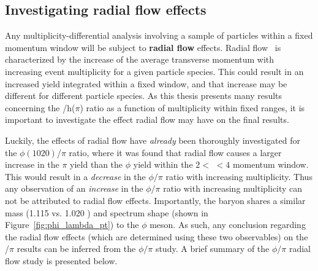 \clearpage

\subsection{Investigating radial flow effects}

Any multiplicity-differential analysis involving a sample of particles within a fixed \pt momentum window will be subject to \textbf{radial flow} effects. Radial flow~\cite{RadialFlow} is characterized by the increase of the average transverse momentum \meanpt with increasing event multiplicity for a given particle species. This could result in an increased yield integrated within a fixed \pt window, and that increase may be different for different particle species. As this thesis presents many results concerning the \lmb/h($\pi$) ratio as a function of multiplicity within fixed \pt ranges, it is important to investigate the effect radial flow may have on the final results.

Luckily, the effects of radial flow have \textit{already} been thoroughly investigated for the $\phi(1020)$/$\pi$ ratio, where it was found that radial flow causes a larger increase in the $\pi$ yield than the $\phi$ yield within the $2 <$ \pt $< 4$ \GeVc momentum window. This would result in a \textit{decrease} in the $\phi / \pi$ ratio with increasing multiplicity. Thus any observation of an \textit{increase} in the $\phi/\pi$ ratio with increasing multiplicity can not be attributed to radial flow effects. Importantly, the \lmb baryon shares a similar mass (1.115 vs. 1.020 \GeVmass) and \pt spectrum shape (shown in Figure~\ref{fig:phi_lambda_pt}) to the $\phi$ meson. As such, any conclusion regarding the radial flow effects (which are determined using these two observables) on the \lmb/$\pi$ results can be inferred from the $\phi/\pi$ study. A brief summary of the $\phi/\pi$ radial flow study is presented below.


